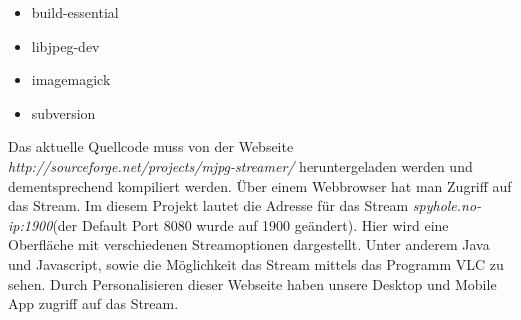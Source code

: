 \begin{itemize}
  \item build-essential
  \item libjpeg-dev
  \item imagemagick
  \item subversion
\end{itemize}

Das aktuelle Quellcode muss von der Webseite \textit{http://sourceforge.net/projects/mjpg-streamer/} heruntergeladen werden und dementsprechend kompiliert werden.\cite{bib.mjpgStreamer} Über einem Webbrowser hat man Zugriff auf das Stream. Im diesem Projekt lautet die Adresse für das Stream \textit{spyhole.no-ip:1900}(der Default Port 8080 wurde auf 1900 geändert). Hier wird eine Oberfläche mit verschiedenen Streamoptionen dargestellt. Unter anderem Java und Javascript, sowie die Möglichkeit das Stream mittels das Programm VLC zu sehen. Durch Personalisieren dieser Webseite haben unsere Desktop und Mobile App zugriff auf das Stream.\\


